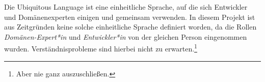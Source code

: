
Die Ubiquitous Language ist eine einheitliche Sprache, auf die sich Entwickler und Domänenexperten einigen und gemeinsam verwenden. In diesem Projekt ist aus Zeitgründen keine solche einheitliche Sprache definiert worden, da die Rollen \textit{Domänen-Expert*in} und \textit{Entwickler*in} von der gleichen Person eingenommen wurden. Verständnisprobleme sind hierbei nicht zu erwarten.\footnote{Aber nie ganz auszuschließen.}


